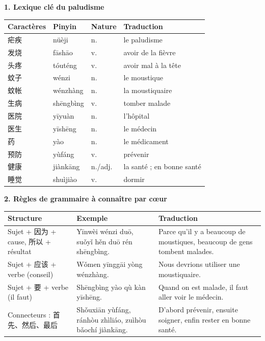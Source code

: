 \documentclass[11pt]{article}
\newcommand{\zh}[1]{\ifmmode\text{#1}\else{#1}\fi}
\begin{document}
\begin{bilan}
\textbf{1. Lexique clé du paludisme}
\begin{center}
\begin{tabularx}{\linewidth}{|X|X|X|X|}\hline
\rowcolor{popblueL} Caractères & Pinyin & Nature & Traduction \\ \hline
疟疾 & nüèji & n. & le paludisme \\ \hline
发烧 & fāshāo & v. & avoir de la fièvre \\ \hline
头疼 & tóuténg & v. & avoir mal à la tête \\ \hline
蚊子 & wénzi & n. & le moustique \\ \hline
蚊帐 & wénzhàng & n. & la moustiquaire \\ \hline
生病 & shēngbìng & v. & tomber malade \\ \hline
医院 & yīyuàn & n. & l'hôpital \\ \hline
医生 & yīshēng & n. & le médecin \\ \hline
药 & yào & n. & le médicament \\ \hline
预防 & yùfáng & v. & prévenir \\ \hline
健康 & jiànkāng & n./adj. & la santé ; en bonne santé \\ \hline
睡觉 & shuìjiào & v. & dormir \\ \hline
\end{tabularx}
\end{center}

\textbf{2. Règles de grammaire à connaître par cœur}
\begin{center}
\begin{tabularx}{\linewidth}{|X|X|X|}\hline
\rowcolor{popblueL} Structure & Exemple & Traduction \\ \hline
Sujet + 因为 + cause, 所以 + résultat & \zh{因为蚊子多，所以很多人生病。} Yīnwèi wénzi duō, suǒyǐ hěn duō rén shēngbìng. & Parce qu'il y a beaucoup de moustiques, beaucoup de gens tombent malades. \\ \hline
Sujet + 应该 + verbe (conseil) & \zh{我们应该用蚊帐。} Wǒmen yīnggāi yòng wénzhàng. & Nous devrions utiliser une moustiquaire. \\ \hline
Sujet + 要 + verbe (il faut) & \zh{生病要去看医生。} Shēngbìng yào qù kàn yīshēng. & Quand on est malade, il faut aller voir le médecin. \\ \hline
Connecteurs : 首先、然后、最后 & \zh{首先预防，然后治疗，最后保持健康。} Shǒuxiān yùfáng, ránhòu zhìliáo, zuìhòu bǎochí jiànkāng. & D'abord prévenir, ensuite soigner, enfin rester en bonne santé. \\ \hline
\end{tabularx}
\end{center}


\end{bilan}
\end{document}
